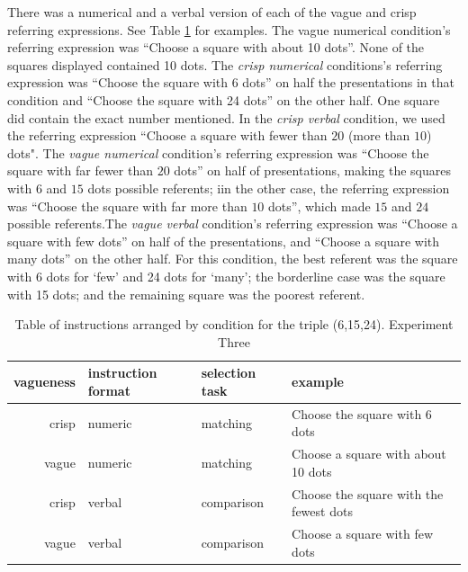 \documentclass[doc,apacite]{apa6}
\begin{document}
There was a numerical and a verbal version of each of the vague and crisp referring expressions. See Table \ref{instructionseB} for examples.
The vague numerical condition's referring expression was ``Choose a square with about 10 dots''. None of the squares displayed contained 10 dots. %
%
The {\em crisp numerical} conditions's referring expression was ``Choose the square with 6 dots'' on half the presentations in that condition and ``Choose the square with 24 dots'' on the other half. One square did contain the exact number mentioned.  In the {\em crisp verbal} condition, we used the referring expression ``Choose a square with fewer than $20$ (more than $10$) dots".  The {\em vague numerical} condition's referring expression was ``Choose the square with far fewer than $20$ dots'' on half of presentations, making the squares with 6 and $15$ dots possible referents; iin the other case, the referring expression was ``Choose the square with far more than $10$ dots'', which made $15$ and $24$ possible referents.The {\em vague verbal} condition's referring expression was ``Choose a square with few dots'' on half of the presentations, and ``Choose a square with many dots'' on the other half. For this condition, the best referent was the square with 6 dots for `few' and 24 dots for `many'; the borderline case was the square with 15 dots; and the remaining square was the poorest referent. 
%


\begin{table}[htbp]
\caption{Table of instructions arranged by condition for the triple (6,15,24). Experiment Three}
\label{instructionseB}
\begin{tabular}{rlll}
\toprule
vagueness&instruction format&selection task&example\\
\midrule
crisp 	& 	numeric	& matching	&Choose the square with 6 dots \\
vague	&	numeric 	& matching	&Choose a square with about 10 dots\\
crisp		&	verbal	& comparison	&Choose the square with the fewest dots\\
vague	&	verbal	& comparison	&Choose a square with few dots\\
\bottomrule
\end{tabular}
\end{table}
\end{document}
